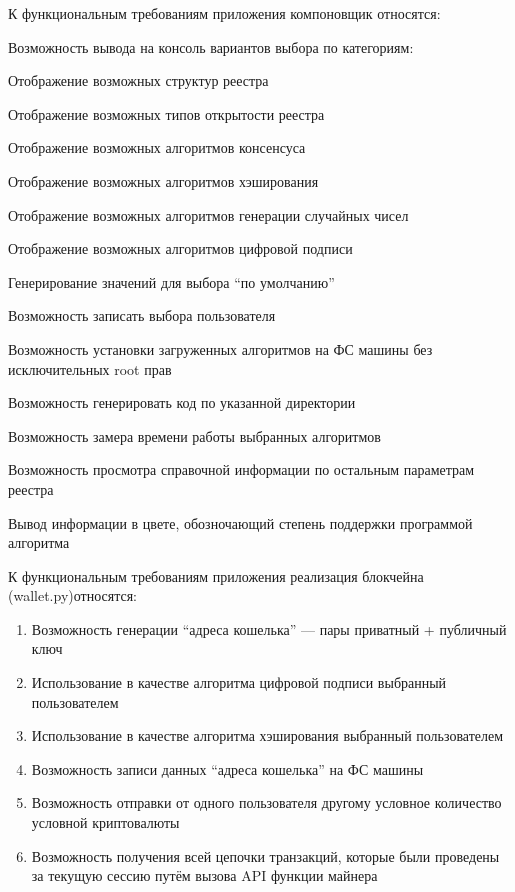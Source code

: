 К функциональным требованиям приложения компоновщик относятся:

\begin{my_enumerate}
    \item Возможность вывода на консоль вариантов выбора по категориям:
        \begin{my_enumerate}
                \item Отображение возможных структур реестра
                \item Отображение возможных типов открытости реестра
                \item Отображение возможных алгоритмов консенсуса
                \item Отображение возможных алгоритмов хэширования
                \item Отображение возможных алгоритмов генерации случайных чисел
                \item Отображение возможных алгоритмов цифровой подписи
        \end{my_enumerate}
    \item Генерирование значений для выбора ``по умолчанию''
    \item Возможность записать выбора пользователя
    \item Возможность установки загруженных алгоритмов на ФС машины без исключительных root прав
    \item Возможность генерировать код по указанной директории
    \item Возможность замера времени работы выбранных алгоритмов
    \item Возможность просмотра справочной информации по остальным параметрам реестра
    \item Вывод информации в цвете, обозночающий степень поддержки программой алгоритма
\end{my_enumerate}


К функциональным требованиям приложения реализация блокчейна ({\small wallet.py})относятся:
\begin{enumerate}
    \item Возможность генерации ``адреса кошелька'' --- пары приватный + публичный ключ
    \item Использование в качестве алгоритма цифровой подписи выбранный пользователем
    \item Использование в качестве алгоритма хэширования выбранный пользователем
    \item Возможность записи данных ``адреса кошелька'' на ФС машины
    \item Возможность отправки от одного пользователя другому условное
          количество условной криптовалюты
    \item Возможность получения всей цепочки транзакций, которые были проведены
          за текущую сессию путём вызова API функции майнера
\end{enumerate}

